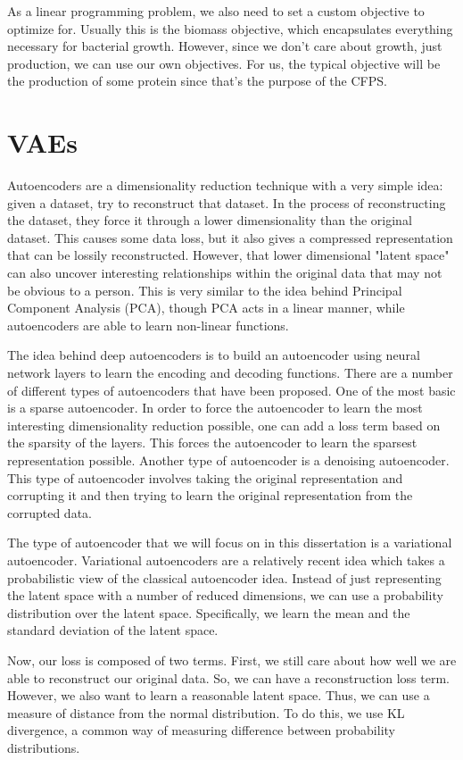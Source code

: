 As a linear programming problem, we also need to set a custom objective to optimize for.
Usually this is the biomass objective, which encapsulates everything necessary for bacterial growth.
However, since we don't care about growth, just production, we can use our own objectives.
For us, the typical objective will be the production of some protein since that's the purpose of the CFPS.

\section{VAEs}
Autoencoders are a dimensionality reduction technique with a very simple idea: given a dataset, try to reconstruct that dataset.
In the process of reconstructing the dataset, they force it through a lower dimensionality than the original dataset.
This causes some data loss, but it also gives a compressed representation that can be lossily reconstructed.
However, that lower dimensional "latent space" can also uncover interesting relationships within the original data that may not be obvious to a person.
This is very similar to the idea behind Principal Component Analysis (PCA), though PCA acts in a linear manner, while autoencoders are able to learn non-linear functions.

The idea behind deep autoencoders is to build an autoencoder using neural network layers to learn the encoding and decoding functions.
There are a number of different types of autoencoders that have been proposed.
One of the most basic is a sparse autoencoder.
In order to force the autoencoder to learn the most interesting dimensionality reduction possible, one can add a loss term based on the sparsity of the layers.
This forces the autoencoder to learn the sparsest representation possible.
Another type of autoencoder is a denoising autoencoder.
This type of autoencoder involves taking the original representation and corrupting it and then trying to learn the original representation from the corrupted data.

The type of autoencoder that we will focus on in this dissertation is a variational autoencoder.
Variational autoencoders are a relatively recent idea which takes a probabilistic view of the classical autoencoder idea.
Instead of just representing the latent space with a number of reduced dimensions, we can use a probability distribution over the latent space.
Specifically, we learn the mean and the standard deviation of the latent space.

Now, our loss is composed of two terms.
First, we still care about how well we are able to reconstruct our original data.
So, we can have a reconstruction loss term.
However, we also want to learn a reasonable latent space.
Thus, we can use a measure of distance from the normal distribution.
To do this, we use KL divergence, a common way of measuring difference between probability distributions.